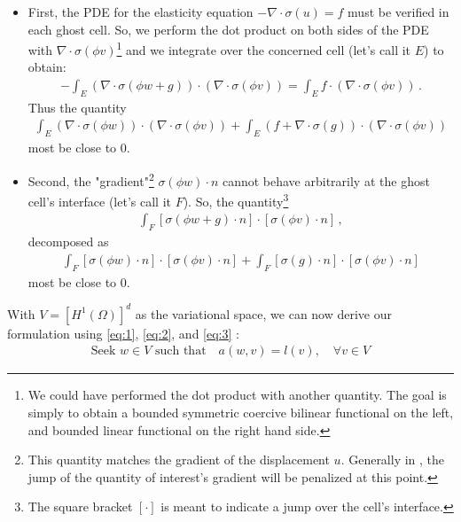 \begin{itemize}
    \item First, the PDE for the elasticity equation $-\nabla \cdot \sigma(u) = f$ must be verified in each ghost cell. So, we perform the dot product on both sides of the PDE with $\nabla \cdot \sigma(\phi v)$\footnote{We could have performed the dot product with another quantity. The goal is simply to obtain a bounded symmetric coercive bilinear functional on the left, and bounded linear functional on the right hand side.} and we integrate over the concerned cell (let's call it $E$) to obtain:
    \begin{align*}
        - \int_{E} \left(\nabla \cdot \sigma(\phi w + g)\right) \cdot \left( \nabla \cdot \sigma(\phi v)\right) = \int_{E} f \cdot \left( \nabla \cdot \sigma(\phi v)\right) \,.
    \end{align*}
    Thus the quantity
    \begin{align}
        \int_{E} \left(\nabla \cdot \sigma(\phi w)\right) \cdot \left( \nabla \cdot \sigma(\phi v)\right) + \int_{E} \left( f + \nabla \cdot \sigma(g) \right) \cdot \left( \nabla \cdot \sigma(\phi v)\right)       
        \label{eq:2}
    \end{align}
    most be close to $0$.
    \item Second, the "gradient"\footnote{This quantity matches the gradient of the displacement $u$. Generally in \phifem, the jump of the quantity of interest's gradient will be penalized at this point.} $\sigma(\phi w) \cdot n$ cannot behave arbitrarily at the ghost cell's interface (let's call it $ F$). So, the quantity\footnote{The square bracket $\left[ \cdot \right]$ is meant to indicate a jump over the cell's interface.}
    \begin{align*}
        \int_{F} \left[\sigma(\phi w + g) \cdot n \right] \cdot \left[ \sigma(\phi v) \cdot n \right] \,,
    \end{align*}
    decomposed as
    \begin{align}
        \int_{F} \left[\sigma(\phi w) \cdot n \right] \cdot \left[ \sigma(\phi v) \cdot n \right] + \int_{F} \left[\sigma(g) \cdot n \right] \cdot \left[ \sigma(\phi v) \cdot n \right]
        \label{eq:3}
    \end{align}
    most be close to $0$.
\end{itemize}
With $V = \left[  H^1(\Omega)\right]^d$ as the variational space, we can now derive our \phifem formulation using \eqref{eq:1}, \eqref{eq:2}, and \eqref{eq:3} :
\begin{align}
    \text{Seek } w \in V \text{ such that} \quad a(w,v)=l(v), \quad \forall v \in V
\end{align}
